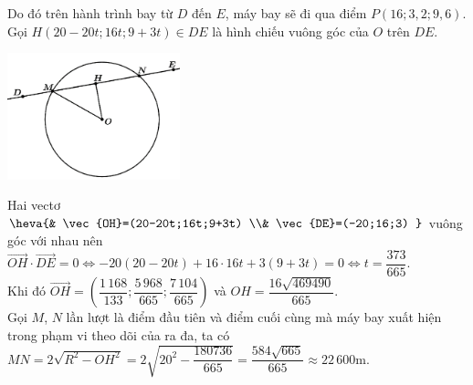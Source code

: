 \begin{ex}
{\begin{itemchoice}
            Do đó trên hành trình bay từ $D$ đến $E$, máy bay sẽ đi qua điểm $P(16;3{,}2;9{,}6)$.
            \itemch Gọi $H(20-20t;16t;9+3t)\in DE$ là hình chiếu vuông góc của $O$ trên $DE$.\\
            \centerline{\includegraphics[width=5cm]{img/HXN-9-15-LG}}
            Hai vectơ $\heva{& \vec{OH}=(20-20t;16t;9+3t) \\& \vec{DE}=(-20;16;3) } $ vuông góc với nhau nên\\
            $\vec{OH}\cdot \vec{DE}=0 \Leftrightarrow -20(20-20t)+16\cdot 16t+3(9+3t)=0\Leftrightarrow t=\dfrac{373}{665}$.\\
            Khi đó $\vec{OH}=\left(\dfrac{1\,168}{133};\dfrac{5\,968}{665};\dfrac{7\,104}{665}\right)$ và $OH=\dfrac{16\sqrt{469490}}{665}$.\\
            Gọi $M$, $N$ lần lượt là điểm đầu tiên và điểm cuối cùng mà máy bay xuất hiện trong phạm vi theo dõi của ra đa, ta có $MN=2\sqrt{R^2-OH^2}=2\sqrt{20^2-\dfrac{180736}{665}}=\dfrac{584\sqrt{665}}{665}\approx 22\,600$m.
        \end{itemchoice}
    }
\end{ex}



